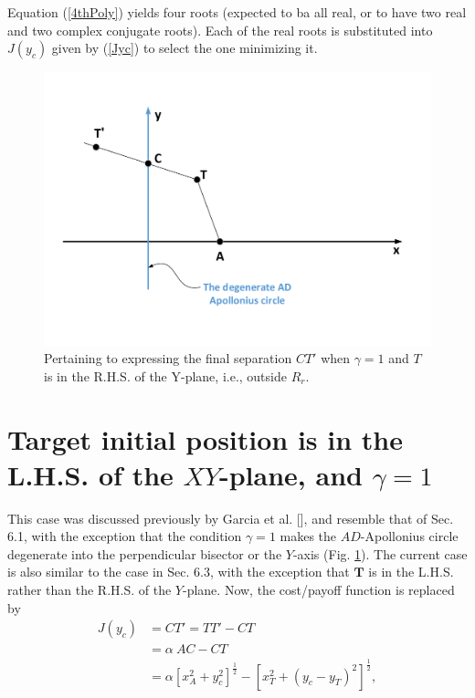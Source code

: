 Equation (\ref{4thPoly}) yields four roots (expected to ba all real, or to have two real and two complex conjugate roots). Each of the real roots is substituted into $J(y_c)$ given by (\ref{Jyc}) to select the one minimizing it.

\begin{figure}[H]
\centering
\includegraphics[width=1.0\textwidth]{fig/Drawing6_4.pdf}
\caption{Pertaining to expressing the final separation $CT'$ when $\gamma=1$ and $T$ is in the R.H.S. of the Y-plane, i.e., outside $R_r$.}
\label{6.4}
\end{figure}

\section{Target initial position is in the L.H.S. of the $XY$-plane, and $\gamma=1$}

This case was discussed previously by Garcia et al. [], and resemble that of Sec. 6.1, with the exception that the condition $\gamma=1$ makes the $AD$-Apollonius circle degenerate into the perpendicular bisector or the $Y$-axis (Fig. \ref{6.4}).
The current case is also similar to the case in Sec. 6.3, with the exception that $\boldsymbol{T}$ is in the L.H.S. rather than the R.H.S. of the $Y$-plane. Now, the cost/payoff function is replaced by 
\begin{equation}
\begin{split}
J(y_c) &= CT' = TT'-CT \\
&=\alpha\ AC -CT \\
&=\alpha [x_A^2 + y_c^2]^{\frac{1}{2}}-[x_T^2 + (y_c - y_T)^2]^{\frac{1}{2}},
\label{Jyc4}
\end{split}
\end{equation}    

